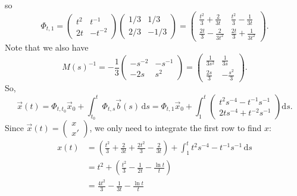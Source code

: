 \documentclass{exam}
\begin{document}
\begin{solution}
\[    \]
    so 
    \[
        \Phi_{t, 1} = \begin{pmatrix}
            t^2 & t^{-1} \\
            2t & -t^{-2}
        \end{pmatrix}
        \begin{pmatrix}
            1/3 & 1/3 \\
            2/3 & -1/3
        \end{pmatrix}
        = \begin{pmatrix}
            \frac{t^2}{3} + \frac{2}{3t} & \frac{t^2}{3} - \frac{1}{3t} \\
            \frac{2t}{3} - \frac{2}{3t^2} & \frac{2t}{3} + \frac{1}{3t^2}
        \end{pmatrix}.
    \]
    Note that we also have 
    \[
        M(s)^{-1} = -\frac{1}{3}\begin{pmatrix}
            -s^{-2} & -s^{-1} \\
            -2s & s^2
        \end{pmatrix}
        = \begin{pmatrix}
            \frac{1}{3s^2} & \frac{1}{3s} \\
            \frac{2s}{3} & -\frac{s^2}{3}
        \end{pmatrix}.
    \]
    So, 
    \[
        \vec{x}(t) = \Phi_{t, t_0}\vec{x}_0 + \int_{t_0}^{t} \Phi_{t, s}\vec{b}(s)\,\mathrm{d}s = \Phi_{t, 1}\vec{x}_0 + \int_1^t \begin{pmatrix}
            t^2s^{-4} - t^{-1}s^{-1} \\
            2ts^{-4} +t^{-2}s^{-1}
        \end{pmatrix} \mathrm{d}s.
    \]
    Since $\vec{x}(t) = \left(\begin{smallmatrix} x \\ x' \end{smallmatrix}\right)$, we only need to integrate the first row to find $x$: 
    \begin{align*}
        x(t) &= \left(\frac{t^2}{3} + \frac{2}{3t} + \frac{2t^2}{3} - \frac{2}{3t}\right) + \int_1^t t^2s^{-4} - t^{-1}s^{-1} \, \mathrm{d}s \\
        &= t^2 + \left(\frac{t^2}{3} - \frac{1}{2t} - \frac{\ln t}{t}\right) \\
        &= \boxed{
            \frac{4t^2}{3} - \frac{1}{3t} - \frac{\ln t}{t}
        }
    \end{align*}
\end{solution}
\end{document}
